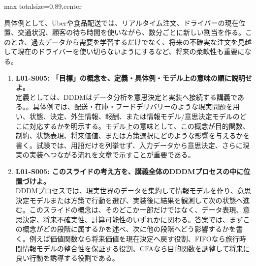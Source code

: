 \begin{minipage}[t]{0.58\textwidth}
\begin{adjustbox}{max totalsize={\textwidth}{0.89\textheight},center}
\begin{minipage}{\textwidth}
具体例として、Uberや食品配送では、リアルタイム注文、ドライバーの現在位置、交通状況、顧客の待ち時間を使いながら、数分ごとに新しい割当を作る。このとき、過去データから需要を学習するだけでなく、将来の不確実な注文を見越して現在のドライバーを使い切らないようにするなど、将来の柔軟性も重要になる。\par{}\begin{enumerate}\item \textbf{L01-S005: 「目標」の概念を、定義・具体例・モデル上の意味の順に説明せよ。}\\定義としては、DDDMはデータ分析を意思決定と実装へ接続する講義である。。具体例では、配送・在庫・フードデリバリーのような現実問題を用い、状態、決定、外生情報、報酬、または情報モデル/意思決定モデルのどこに対応するかを明示する。モデル上の意味として、この概念が目的関数、制約、状態表現、将来価値、または方策選択にどのような影響を与えるかを書く。試験では、用語だけを列挙せず、入力データから意思決定、さらに現実の実装へつながる流れを文章で示すことが重要である。\item \textbf{L01-S005: このスライドの考え方を、講義全体のDDDMプロセスの中に位置づけよ。}\\DDDMプロセスでは、現実世界のデータを集約して情報モデルを作り、意思決定モデルまたは方策で行動を選び、実装後に結果を観測して次の状態へ進む。このスライドの概念は、そのどこか一部だけではなく、データ表現、意思決定、将来不確実性、計算可能性のいずれかに関わる。答案では、まずこの概念がどの段階に属するかを述べ、次に他の段階へどう影響するかを書く。例えば価値関数なら将来価値を現在決定へ戻す役割、FIFOなら旅行時間情報モデルの整合性を保証する役割、CFAなら目的関数を調整して将来に良い行動を誘導する役割である。\end{enumerate}
\end{minipage}
\end{adjustbox}
\end{minipage}


